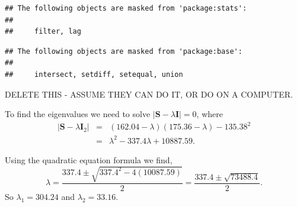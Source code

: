 \documentclass[]{book}
\newenvironment{Shaded}{\begin{snugshade}}{\end{snugshade}}
\newcommand{\DataTypeTok}[1]{\textcolor[rgb]{0.13,0.29,0.53}{#1}}
\newcommand{\DecValTok}[1]{\textcolor[rgb]{0.00,0.00,0.81}{#1}}
\newcommand{\KeywordTok}[1]{\textcolor[rgb]{0.13,0.29,0.53}{\textbf{#1}}}
\newcommand{\NormalTok}[1]{#1}
\newcommand{\OperatorTok}[1]{\textcolor[rgb]{0.81,0.36,0.00}{\textbf{#1}}}
\newcommand{\StringTok}[1]{\textcolor[rgb]{0.31,0.60,0.02}{#1}}
\theoremstyle{definition}
\theoremstyle{definition}
\theoremstyle{definition}
\theoremstyle{remark}
\begin{document}
\begin{verbatim}
## The following objects are masked from 'package:stats':
## 
##     filter, lag
\end{verbatim}

\begin{verbatim}
## The following objects are masked from 'package:base':
## 
##     intersect, setdiff, setequal, union
\end{verbatim}

\begin{Shaded}
\end{Shaded}

DELETE THIS - ASSUME THEY CAN DO IT, OR DO ON A COMPUTER.

To find the eigenvalues we need to solve \(|\boldsymbol S- \lambda \boldsymbol I| = 0\), where
\begin{eqnarray*}
|\boldsymbol S- \lambda \boldsymbol I_2| &=& (162.04-\lambda)(175.36-\lambda) - 135.38^2 \\
&=& \lambda^2 - 337.4 \lambda + 10887.59.
\end{eqnarray*}

Using the quadratic equation formula we find,
\[ \lambda = \frac{337.4 \pm \sqrt{337.4^2 - 4(10087.59)}}{2} = \frac{337.4 \pm \sqrt{73488.4}}{2}. \]
So \(\lambda_1 = 304.24\) and \(\lambda_2 = 33.16\).
\end{document}
